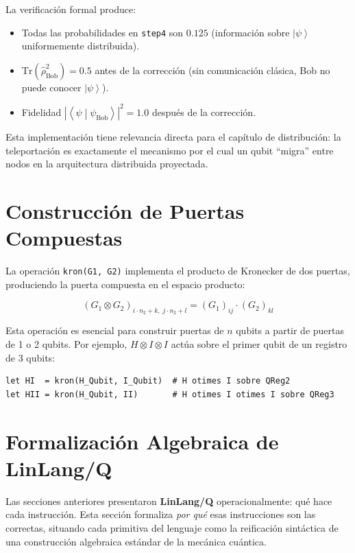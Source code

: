 \documentclass[12pt, a4paper, openany]{report}
\theoremstyle{definition}
\newcommand{\linlangQ}{\textbf{LinLang/Q}}
\newcommand{\ket}[1]{\left|#1\right\rangle}
\newcommand{\braketnotation}[2]{\left\langle#1\middle|#2\right\rangle}
\newcommand{\density}{\hat{\rho}}
\newcommand{\tr}{\mathrm{Tr}}
\begin{document}
La verificación formal produce:
\begin{itemize}
  \item Todas las probabilidades en \texttt{step4} son $0.125$ (información sobre $\ket{\psi}$ uniformemente distribuida).
  \item $\tr(\density_{\text{Bob}}^2) = 0.5$ antes de la corrección (sin comunicación clásica, Bob no puede conocer $\ket{\psi}$).
  \item Fidelidad $|\braketnotation{\psi}{\psi_{\text{Bob}}}|^2 = 1.0$ después de la corrección.
\end{itemize}

Esta implementación tiene relevancia directa para el capítulo de distribución: la teleportación es exactamente el mecanismo por el cual un qubit ``migra'' entre nodos en la arquitectura distribuida proyectada.

\section{Construcción de Puertas Compuestas}
\label{sec:puertas-compuestas}

La operación \texttt{kron(G1, G2)} implementa el producto de Kronecker de dos puertas, produciendo la puerta compuesta en el espacio producto:

\[
  (G_1 \otimes G_2)_{i \cdot n_2 + k,\; j \cdot n_2 + l} = (G_1)_{ij} \cdot (G_2)_{kl}
\]

Esta operación es esencial para construir puertas de $n$ qubits a partir de puertas de 1 o 2 qubits. Por ejemplo, $H \otimes I \otimes I$ actúa sobre el primer qubit de un registro de 3 qubits:

\begin{lstlisting}
let HI  = kron(H_Qubit, I_Qubit)  # H otimes I sobre QReg2
let HII = kron(H_Qubit, II)       # H otimes I otimes I sobre QReg3
\end{lstlisting}

\section{Formalización Algebraica de \linlangQ{}}
\label{sec:formalizacion-algebra}

Las secciones anteriores presentaron \linlangQ{} operacionalmente: qué hace cada instrucción. Esta sección formaliza \emph{por qué} esas instrucciones son las correctas, situando cada primitiva del lenguaje como la reificación sintáctica de una construcción algebraica estándar de la mecánica cuántica.
\end{document}
